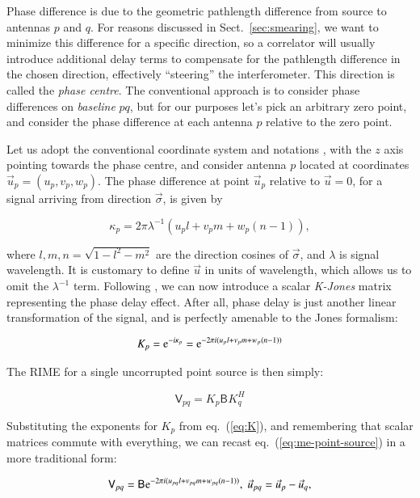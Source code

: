 \documentclass[]{aa}
\newcommand{\herm}{H}
\newcommand{\coh}[2]{\mathsf{{#1}}_{{#2}}}
\begin{document}
Phase difference is due to the geometric pathlength difference from source to antennas $p$ and $q$. For reasons discussed in Sect.~\ref{sec:smearing}, we want to minimize this difference for a specific direction, so a correlator will usually introduce additional delay terms to compensate for the pathlength difference in the chosen direction, effectively ``steering'' the interferometer. This direction is called the {\em phase centre}. The conventional approach is to consider phase differences on {\em baseline} $pq$, but for our purposes let's pick an arbitrary zero point, and consider the phase difference at each antenna $p$ relative to the zero point.

Let us adopt the conventional coordinate system and notations \citep[see e.g.][]{tms}, with the $z$ axis pointing towards the phase centre, and consider antenna $p$ located at coordinates $\vec u_p=(u_p,v_p,w_p)$. The phase difference at point $\vec u_p$ relative to $\vec u=0$, for a signal arriving from direction $\vec\sigma$, is given by

  \[
  \kappa_p = 2\pi\lambda^{-1}(u_p l+v_p m+w_p (n-1)),
  \]

where $l,m,n=\sqrt{1-l^2-m^2}$ are the direction cosines of $\vec\sigma$, and $\lambda$ is signal wavelength. It is customary to define $\vec u$ in units of wavelength, which allows us to omit the $\lambda^{-1}$ term.
Following \citet{JEN:note185}, we can now introduce a scalar {\em K-Jones} matrix representing the phase delay effect. After all, phase delay is just another linear transformation of the signal, and is perfectly amenable to the Jones formalism:

  \begin{equation}\label{eq:K}
  K_p = {\rm e}^{-i\kappa_p} = {\rm e}^{-2\pi i(u_p l+v_p m+w_p (n-1))}
  \end{equation}

The RIME for a single uncorrupted point source is then simply:

  \begin{equation}\label{eq:me-point-source}
  \coh{V}{pq} = K_p \coh{B}{}  K^\herm_q
  \end{equation}

Substituting the exponents for $K_p$ from eq.~(\ref{eq:K}), and remembering that scalar matrices commute with everything, we can recast eq.~(\ref{eq:me-point-source}) in a more traditional form:

  \begin{equation}\label{eq:me-point-source-uvw}
  \coh{V}{pq} = \coh{B}{}  {\rm e}^{-2\pi i(u_{pq} l+v_{pq} m+w_{pq} (n-1))},\;\vec u_{pq} = \vec u_p - \vec u_q,
  \end{equation}
 
\end{document}
